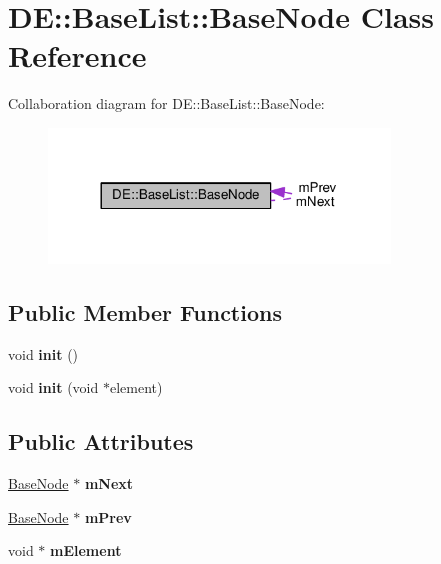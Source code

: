 \hypertarget{classDE_1_1BaseList_1_1BaseNode}{}\section{DE\+:\+:Base\+List\+:\+:Base\+Node Class Reference}
\label{classDE_1_1BaseList_1_1BaseNode}


Collaboration diagram for DE\+:\+:Base\+List\+:\+:Base\+Node\+:\nopagebreak
\begin{figure}[H]
\begin{center}
\leavevmode
\includegraphics[width=257pt]{classDE_1_1BaseList_1_1BaseNode__coll__graph}
\end{center}
\end{figure}
\subsection*{Public Member Functions}
\begin{DoxyCompactItemize}
\item 
void {\bfseries init} ()\hypertarget{classDE_1_1BaseList_1_1BaseNode_abf2670b2c8a2be2da32f1c3311b8fe5c}{}\label{classDE_1_1BaseList_1_1BaseNode_abf2670b2c8a2be2da32f1c3311b8fe5c}

\item 
void {\bfseries init} (void $\ast$element)\hypertarget{classDE_1_1BaseList_1_1BaseNode_a54541a1cc63b48a4f5ebad2a279718e4}{}\label{classDE_1_1BaseList_1_1BaseNode_a54541a1cc63b48a4f5ebad2a279718e4}

\end{DoxyCompactItemize}
\subsection*{Public Attributes}
\begin{DoxyCompactItemize}
\item 
\hyperlink{classDE_1_1BaseList_1_1BaseNode}{Base\+Node} $\ast$ {\bfseries m\+Next}\hypertarget{classDE_1_1BaseList_1_1BaseNode_a888ef5f6584191fa6d92e9dc1df52c2c}{}\label{classDE_1_1BaseList_1_1BaseNode_a888ef5f6584191fa6d92e9dc1df52c2c}

\item 
\hyperlink{classDE_1_1BaseList_1_1BaseNode}{Base\+Node} $\ast$ {\bfseries m\+Prev}\hypertarget{classDE_1_1BaseList_1_1BaseNode_a94243487fddf9c0f9929fd556da89c61}{}\label{classDE_1_1BaseList_1_1BaseNode_a94243487fddf9c0f9929fd556da89c61}

\item 
void $\ast$ {\bfseries m\+Element}\hypertarget{classDE_1_1BaseList_1_1BaseNode_a8da52c072df5d392289e388f7dd32650}{}\label{classDE_1_1BaseList_1_1BaseNode_a8da52c072df5d392289e388f7dd32650}

\end{DoxyCompactItemize}


